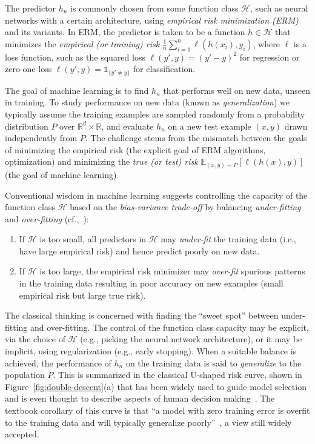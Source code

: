 \documentclass[11pt]{article}
\newcommand{\E}{{\mathbb{E}}}
\newcommand{\R}{{\mathbb{R}}}
\newcommand{\cH}{{\mathcal{H}}}
\newcommand\ind[1]{\mathds{1}_{\{#1\}}}
\begin{document}
The predictor $h_n$ is commonly chosen from some function class $\cH$, such as  neural networks with a certain architecture, using \emph{empirical risk minimization (ERM)} and its variants.
In ERM, the predictor is taken to be a function $h \in \cH$ that minimizes the \emph{empirical (or training) risk} $\frac1n \sum_{i=1}^n \ell(h(x_i), y_i)$, where $\ell$ is a loss function, such as the squared loss $\ell(y',y) = (y' - y)^2$ for regression or zero-one loss $\ell(y',y) = \ind{y' \neq y}$ for classification.

The goal of machine learning is to find $h_n$ that performs well on new data, unseen in training. 
To study performance on new data  (known as {\it generalization}) we typically assume the training examples are sampled randomly from a probability distribution $P$ over $\R^d \times \R$, and evaluate $h_n$ on a new test example $(x,y)$ drawn independently from $P$. The challenge stems from the mismatch between the goals of minimizing the empirical risk (the explicit goal of ERM algorithms, optimization) and minimizing the \emph{true (or test) risk} $\E_{(x,y)\sim P}[\ell(h(x),y)]$ (the goal of machine learning).


Conventional wisdom in machine learning suggests controlling the capacity of the function class $\cH$ based on the {\em bias-variance trade-off} by balancing \emph{under-fitting} and \emph{over-fitting} (cf.,~\cite{geman1992neural,friedman2001elements}): 
\begin{enumerate}
  \item
    If $\cH$ is too small, all predictors in $\cH$ may \emph{under-fit} the training data (i.e., have large empirical risk) and hence predict poorly on new data.

  \item
    If $\cH$ is too large, the empirical risk minimizer may \emph{over-fit} spurious patterns in the training data resulting in poor accuracy on new examples (small empirical risk but large true risk).
\end{enumerate}
The classical thinking is concerned with finding the ``sweet spot'' between under-fitting and over-fitting.
The control of the function class capacity may be explicit, via the choice of $\cH$ (e.g., picking the neural network architecture), or it may be implicit, using regularization (e.g., early stopping).
When a suitable balance is achieved, the performance of $h_n$ on the training data is said to \emph{generalize} to the population $P$.
This is summarized in the classical U-shaped risk curve, shown in Figure~\ref{fig:double-descent}(a) that has been widely used to guide  model selection and is even thought to describe aspects of human decision making~\cite{gigerenzer2009homo}.
The textbook corollary of this curve is that ``a model with zero training error is overfit to the training data and will typically generalize poorly''~\cite[page 221]{friedman2001elements}, a view still widely accepted.
\end{document}
